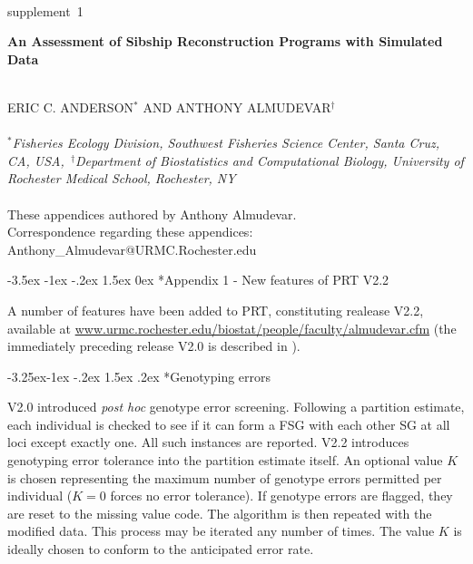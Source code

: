 \documentclass[twoside,10pt,twocolumn]{article}
\makeatletter
\renewcommand\section{\@startsection {section}{1}{\z@}%
                                   {-3.5ex \@plus -1ex \@minus -.2ex}%
                                   {1.5ex \@plus 0ex}%
                                   {\normalfont\normalsize\bfseries}}
\renewcommand\subsection{\@startsection{subsection}{2}{\z@}%
                                     {-3.25ex\@plus -1ex \@minus -.2ex}%
                                     {1.5ex \@plus .2ex}%
                                     {\normalfont\normalsize\itshape}}
\makeatother
\begin{document}
\pagestyle{fancyplain}



   \begin{strip}
   \vspace*{-.5in}
   \mbox{}\\
   {\large\sc supplement~1}
   \mbox{}\\
        {\LARGE\bf An Assessment of Sibship Reconstruction Programs with Simulated Data \par}
    \mbox{}\\
    \uppercase{ Eric C. Anderson$^*$ and Anthony Almudevar$^\dagger$} \\
       \mbox{}\\
    $^*${\em Fisheries Ecology Division, Southwest Fisheries Science Center, Santa Cruz, CA, 
    USA,~$^\dagger$Department of Biostatistics and Computational Biology,
		University of Rochester Medical School, Rochester, NY}\\
    \mbox{}\\
    These appendices authored by Anthony Almudevar.\\
    Correspondence regarding these appendices: Anthony\_Almudevar@URMC.Rochester.edu
\vspace*{.4in}
   \end{strip}


\section*{Appendix 1 - New features of PRT V2.2} 

A number of features have been added to PRT, constituting realease V2.2, available at  
\url{www.urmc.rochester.edu/biostat/people/faculty/almudevar.cfm}  (the immediately preceding release V2.0 
is described in \citet{alm&and11}).

\subsection*{Genotyping errors}

V2.0 introduced \emph{post hoc} genotype error screening.  Following a partition estimate, each individual 
is checked to see if it can form a FSG with each other SG at all loci except exactly one. All such instances 
are reported. V2.2 introduces genotyping error tolerance into the partition estimate itself. An optional 
value $K$ is chosen representing the maximum number of genotype errors permitted per individual ($K=0$ 
forces no error tolerance). If genotype errors are flagged, they are reset to the missing value code. The 
algorithm is then repeated with the modified data. This process may be iterated any number of times.   The 
value $K$ is ideally chosen to conform to the anticipated error rate. 
\end{document}
